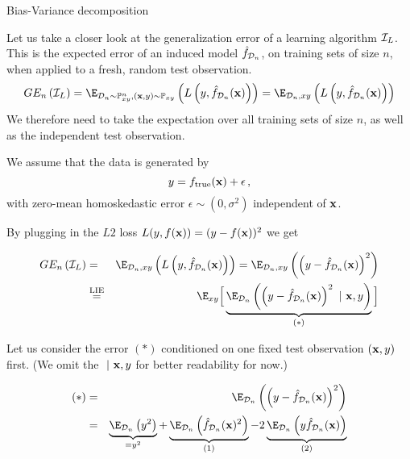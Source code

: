 \documentclass[11pt,compress,t,notes=noshow, xcolor=table]{beamer}
\begin{document}
\begin{vbframe} {Bias-Variance decomposition}

Let us take a closer look at the generalization error of a learning algorithm $\mathcal{I}_{L}$.
This is the expected error of an induced model $\hat{f}_{\mathcal{D}_n}$, on training sets of size $n$, when applied to a fresh, random test observation.
  $$GE_n\left(\ind_{L}\right) = \E_{\D_n \sim \Pxy^n, (\xv, y) \sim \Pxy}\left( L\left(y, \fh_{\D_n}(\xv)\right) \right) = \E_{\D_n, xy}\left( L\left(y, \fh_{\D_n}(\xv)\right) \right)  $$
We therefore need to take the expectation over all training sets of size $n$, as well as the independent test observation.

\lz 

We assume that the data is generated by 
$$
y = f_{\text{true}}(\mathbf{x}) + \epsilon\,,
$$
with zero-mean homoskedastic error $\epsilon \sim (0, \sigma^2)$ independent of $\mathbf{x}$.  

\framebreak 

By plugging in the $L2$ loss $L(y, f(\mathbf{x})) = (y - f(\mathbf{x}))^2$ we get

\begin{footnotesize}
\begin{eqnarray*}
GE_n\left(\ind_{L}\right) &=& \E_{\D_n, xy}\left( L\left(y, \fh_{\D_n}(\xv)\right)\right) = \E_{\D_n, xy}\left(\left(y - \fh_{\D_n}(\xv)\right)^2\right) \\
&\stackrel{\text{LIE}}{=}& \E_{xy}\Big[\underbrace{\E_{\D_n}\left(\left(y - \fh_{\D_n}(\xv)\right)^2~|~ \xv, y\right)}_{(*)}\Big] 
\end{eqnarray*}
\end{footnotesize}

Let us consider the error $(*)$ conditioned on one fixed test observation $(\mathbf{x}, y)$ first. (We omit the $~|~\mathbf{x}, y$ for better readability for now.)

\begin{footnotesize}
\begin{eqnarray*}
(*) &=& \E_{\D_n}\left(\left(y - \fh_{\D_n}(\xv)\right)^2\right)\\
&=& \underbrace{\E_{\D_n}\left(y^2\right)}_{= y^2} + \underbrace{\E_{\D_n}\left(\fh_{\D_n}(\xv)^2\right)}_{(1)}  - 2\underbrace{\E_{\D_n}\left(y\fh_{\D_n}(\xv)\right)}_{(2)} 
\end{eqnarray*}
\end{footnotesize}


\end{vbframe}
\end{document}
